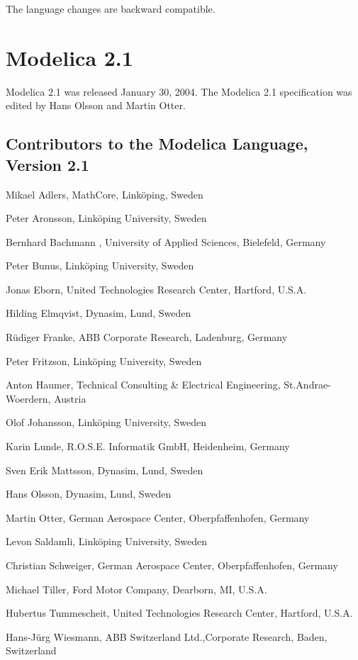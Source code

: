 \documentclass[10pt,a4paper]{report}
\def\doublelabel#1{\label{#1}\hypertarget{#1}{}}
\begin{document}
The language changes are backward compatible.

\section{Modelica 2.1}\doublelabel{modelica-2-1}

Modelica 2.1 was released January 30, 2004. The Modelica 2.1
specification was edited by Hans Olsson and Martin Otter.

\subsection{Contributors to the Modelica Language, Version 2.1}\doublelabel{contributors-to-the-modelica-language-version-2-1}

Mikael Adlers, MathCore, Linköping, Sweden

Peter Aronsson, Linköping University, Sweden

Bernhard Bachmann , University of Applied Sciences, Bielefeld, Germany

Peter Bunus, Linköping University, Sweden

Jonas Eborn, United Technologies Research Center, Hartford, U.S.A.

Hilding Elmqvist, Dynasim, Lund, Sweden

Rüdiger Franke, ABB Corporate Research, Ladenburg, Germany

Peter Fritzson, Linköping University, Sweden

Anton Haumer, Technical Consulting \& Electrical Engineering,
St.Andrae-Woerdern, Austria

Olof Johansson, Linköping University, Sweden

Karin Lunde, R.O.S.E. Informatik GmbH, Heidenheim, Germany

Sven Erik Mattsson, Dynasim, Lund, Sweden

Hans Olsson, Dynasim, Lund, Sweden

Martin Otter, German Aerospace Center, Oberpfaffenhofen, Germany

Levon Saldamli, Linköping University, Sweden

Christian Schweiger, German Aerospace Center, Oberpfaffenhofen, Germany

Michael Tiller, Ford Motor Company, Dearborn, MI, U.S.A.

Hubertus Tummescheit, United Technologies Research Center, Hartford,
U.S.A.

Hans-Jürg Wiesmann, ABB Switzerland Ltd.,Corporate Research, Baden,
Switzerland
\end{document}
